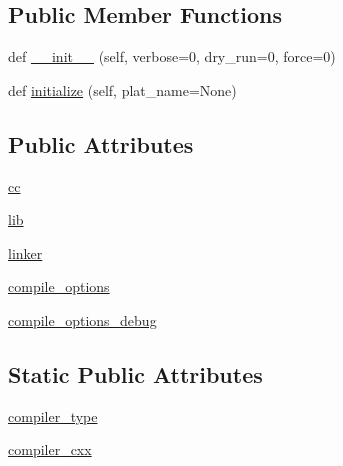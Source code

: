 \subsection*{Public Member Functions}
\begin{DoxyCompactItemize}
\item 
def \hyperlink{classnumpy_1_1distutils_1_1intelccompiler_1_1IntelCCompilerW_a7073eaba404d17bf46ac583d83d6cec4}{\+\_\+\+\_\+init\+\_\+\+\_\+} (self, verbose=0, dry\+\_\+run=0, force=0)
\item 
def \hyperlink{classnumpy_1_1distutils_1_1intelccompiler_1_1IntelCCompilerW_a614412b49947cdd9fac41d01c7544803}{initialize} (self, plat\+\_\+name=None)
\end{DoxyCompactItemize}
\subsection*{Public Attributes}
\begin{DoxyCompactItemize}
\item 
\hyperlink{classnumpy_1_1distutils_1_1intelccompiler_1_1IntelCCompilerW_a5bde42622a4aae37027bf58595a5bc3d}{cc}
\item 
\hyperlink{classnumpy_1_1distutils_1_1intelccompiler_1_1IntelCCompilerW_ab9e447cf12a7fd143e51a8b1386ea6f5}{lib}
\item 
\hyperlink{classnumpy_1_1distutils_1_1intelccompiler_1_1IntelCCompilerW_ae383ef97424650d36d05104eab7172a6}{linker}
\item 
\hyperlink{classnumpy_1_1distutils_1_1intelccompiler_1_1IntelCCompilerW_a5e14b0bc9f0217c9f3bbb5b9b0db50b9}{compile\+\_\+options}
\item 
\hyperlink{classnumpy_1_1distutils_1_1intelccompiler_1_1IntelCCompilerW_ad41b34996fce2cb35c71090732b21881}{compile\+\_\+options\+\_\+debug}
\end{DoxyCompactItemize}
\subsection*{Static Public Attributes}
\begin{DoxyCompactItemize}
\item 
\hyperlink{classnumpy_1_1distutils_1_1intelccompiler_1_1IntelCCompilerW_a79de1b15623c845cff1026139b5b43a8}{compiler\+\_\+type}
\item 
\hyperlink{classnumpy_1_1distutils_1_1intelccompiler_1_1IntelCCompilerW_a05d1d6369bf4d7cdcac161959836554a}{compiler\+\_\+cxx}
\end{DoxyCompactItemize}


